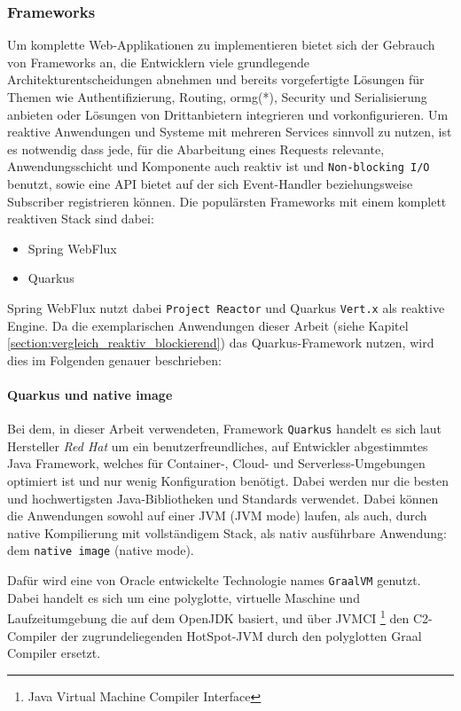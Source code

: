 \subsubsection{Frameworks}
\label{subsubsec:frameworks}
Um komplette Web-Applikationen zu implementieren bietet sich der Gebrauch von Frameworks an, die Entwicklern viele grundlegende Architekturentscheidungen
abnehmen und bereits vorgefertigte Lösungen für Themen wie Authentifizierung, Routing, \Gls{ormg}(*), Security und Serialisierung anbieten oder
Lösungen von Drittanbietern integrieren und vorkonfigurieren.
Um reaktive Anwendungen und Systeme mit mehreren Services sinnvoll zu nutzen, ist es notwendig dass jede, für die Abarbeitung eines Requests relevante,
Anwendungsschicht und Komponente auch reaktiv ist und \verb|Non-blocking I/O| benutzt, sowie eine API bietet auf der
sich Event-Handler beziehungsweise Subscriber registrieren können.\newline
Die populärsten Frameworks mit einem komplett reaktiven Stack sind dabei:

\begin{itemize}
  \item Spring WebFlux
  \item Quarkus
\end{itemize}

Spring WebFlux nutzt dabei \verb|Project Reactor| und Quarkus \verb|Vert.x| als reaktive Engine. \parencite{QuarkusReactiveGettingStarted}
Da die exemplarischen Anwendungen dieser Arbeit (siehe Kapitel \ref{section:vergleich_reaktiv_blockierend}) das Quarkus-Framework nutzen, wird dies
im Folgenden genauer beschrieben:
\paragraph{Quarkus und native image}

Bei dem, in dieser Arbeit verwendeten, Framework \verb|Quarkus| handelt es sich laut Hersteller \textit{Red Hat} um ein
benutzerfreundliches, auf Entwickler abgestimmtes Java Framework, welches für Container-, Cloud- und Serverless-Umgebungen optimiert ist und nur wenig
Konfiguration benötigt. Dabei werden nur die besten und hochwertigsten Java-Bibliotheken und Standards verwendet.
Dabei können die Anwendungen sowohl auf einer JVM (JVM mode) laufen, als auch, durch native Kompilierung mit vollständigem Stack,
als nativ ausführbare Anwendung: dem \verb|native image| (native mode).

Dafür wird eine von Oracle entwickelte Technologie names \verb|GraalVM| genutzt.
Dabei handelt es sich um eine polyglotte, virtuelle Maschine und Laufzeitumgebung die auf dem OpenJDK basiert, und über
JVMCI \footnote{Java Virtual Machine Compiler Interface} den C2-Compiler der zugrundeliegenden HotSpot-JVM durch den
polyglotten Graal Compiler ersetzt.\parencite{GraalVM}


